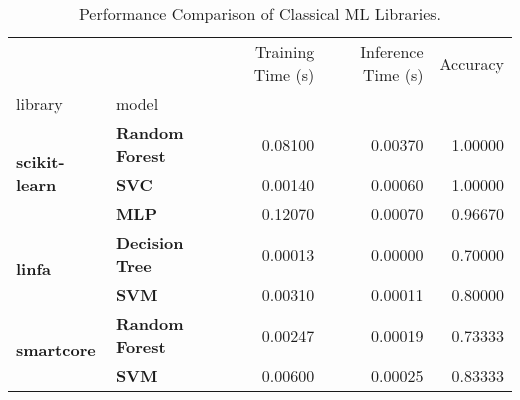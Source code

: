\begin{table}
\caption{Performance Comparison of Classical ML Libraries.}
\label{tab:classical_ml_results}
\begin{tabular}{llrrr}
\toprule
 &  & Training Time (s) & Inference Time (s) & Accuracy \\
library & model &  &  &  \\
\midrule
\multirow[t]{3}{*}{\textbf{scikit-learn}} & \textbf{Random Forest} & 0.08100 & 0.00370 & 1.00000 \\
\textbf{} & \textbf{SVC} & 0.00140 & 0.00060 & 1.00000 \\
\textbf{} & \textbf{MLP} & 0.12070 & 0.00070 & 0.96670 \\
\cline{1-5}
\multirow[t]{2}{*}{\textbf{linfa}} & \textbf{Decision Tree} & 0.00013 & 0.00000 & 0.70000 \\
\textbf{} & \textbf{SVM} & 0.00310 & 0.00011 & 0.80000 \\
\cline{1-5}
\multirow[t]{2}{*}{\textbf{smartcore}} & \textbf{Random Forest} & 0.00247 & 0.00019 & 0.73333 \\
\textbf{} & \textbf{SVM} & 0.00600 & 0.00025 & 0.83333 \\
\cline{1-5}
\bottomrule
\end{tabular}
\end{table}
